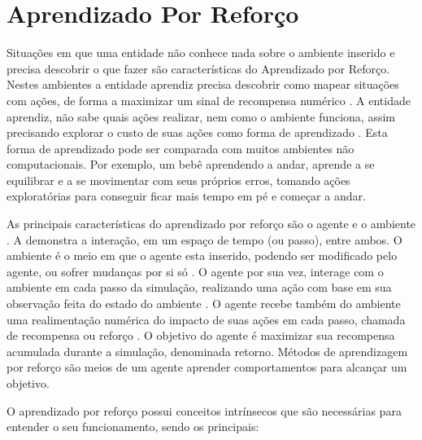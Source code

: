 \section{Aprendizado Por Reforço}
\label{sec:rl}

Situações em que uma entidade não conhece nada sobre o ambiente inserido e precisa descobrir o que fazer são características do Aprendizado por Reforço. Nestes ambientes a entidade aprendiz precisa descobrir como mapear situações com ações, de forma a maximizar um sinal de recompensa numérico \cite{rl_intro}. A entidade aprendiz, não sabe quais ações realizar, nem como o ambiente funciona, assim precisando explorar o custo de suas ações como forma de aprendizado \cite{modern_approach}. Esta forma de aprendizado pode ser comparada com muitos ambientes não computacionais. Por exemplo, um bebê aprendendo a andar, aprende a se equilibrar e a se movimentar com seus próprios erros, tomando ações exploratórias para conseguir ficar mais tempo em pé e começar a andar.

As principais características do aprendizado por reforço são o agente e o ambiente \cite{machinelearning}. A  demonstra a interação, em um espaço de tempo (ou passo), entre ambos. O ambiente é o meio em que o agente esta inserido, podendo ser modificado pelo agente, ou sofrer mudanças por si só \cite{rl_intro}. O agente por sua vez, interage com o ambiente em cada passo da simulação, realizando uma ação com base em sua observação feita do estado do ambiente \cite{rl_intro}. O agente recebe também do ambiente uma realimentação numérica do impacto de suas ações em cada passo, chamada de recompensa ou reforço \cite{modern_approach}. O objetivo do agente é maximizar sua recompensa acumulada durante a simulação, denominada retorno. Métodos de aprendizagem por reforço são meios de um agente aprender comportamentos para alcançar um objetivo.

%

O aprendizado por reforço possui conceitos intrínsecos que são necessárias para entender o seu funcionamento, sendo os principais:

